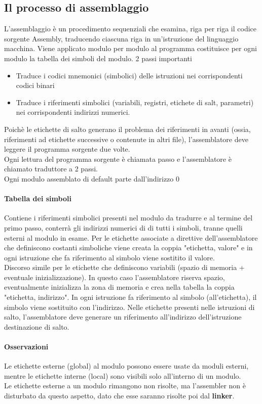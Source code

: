 \documentclass[12pt, a4paper, openany]{book}
\begin{document}
\subsection{Il processo di assemblaggio}
L'assemblaggio è un procedimento sequenziali che esamina, riga per riga il codice sorgente
Assembly, traducendo ciascuna riga in un'istruzione del linguaggio macchina.
Viene applicato modulo per modulo al programma costituisce per ogni modulo la tabella dei 
simboli del modulo.
2 passi importanti \begin{itemize}
    \item Traduce i codici mnemonici (simbolici) delle istruzioni nei corrispondenti
    codici binari
    \item Traduce i riferimenti simbolici (variabili, registri, etichete di salt, parametri)
    nei corrispondenti indirizzi numerici.
\end{itemize}
Poichè le etichette di salto generano il problema dei riferimenti in avanti (ossia,
riferimenti ad etichette successive o contenute in altri file), l'assemblatore deve leggere
il programma sorgente due volte.
\\ Ogni lettura del programma sorgente è chiamata passo e l'assemblatore è chiamato traduttore
a 2 passi.
\\ Ogni modulo assemblato di default parte dall'indirizzo 0
\paragraph*{Tabella dei simboli} Contiene i riferimenti simbolici presenti nel modulo
da tradurre e al termine del primo passo, conterrà gli indirizzi numerici di
di tutti i simboli, tranne quelli esterni al modulo in esame.
Per le etichette associate a direttive dell'assemblatore che definiscono costanti
simboliche viene creata la coppia "etichetta, valore" e in ogni istruzione che
fa riferimento al simbolo viene sostitito il valore.
\\ Discorso simile per le etichette che definiscono variabili (spazio di memoria +
eventuale inizializzazione). In questo caso l'assemblatore riserva spazio, eventualmente
inizializza la zona di memoria e crea nella tabella la coppia "etichetta, indirizzo".
In ogni istruzione fa riferimento al simbolo (all'etichetta), il simbolo viene
sostituito con l'indirizzo.
Nelle etichette presenti nelle istruzioni di salto, l'assemblatore deve generare un
riferimento all'indirizzo dell'istruzione destinazione di salto.
\paragraph*{Osservazioni} Le etichette esterne (global) al modulo possono essere usate
da moduli esterni, mentre le etichette interne (local) sono visibili solo all'interno 
di un modulo.
\\ Le etichette esterne a un modulo rimangono non risolte, ma l'assembler non è disturbato
da questo aspetto, dato che esse saranno risolte poi dal \textbf{linker}.
\end{document}
